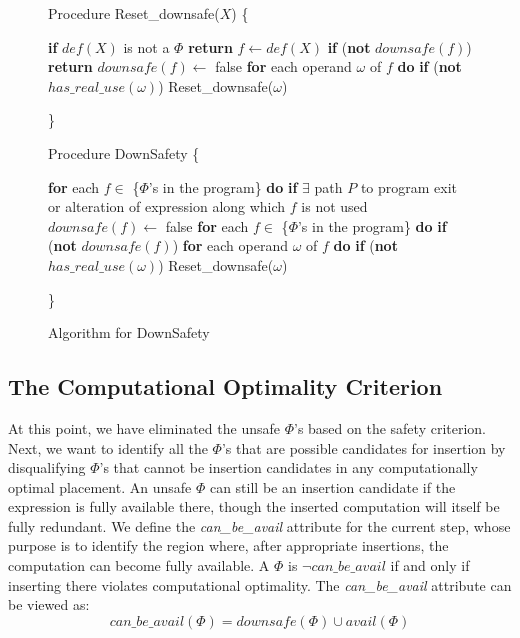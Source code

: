 \begin{figure}[!ht]
\setcounter{linectr}{0}
\centering
\begin{minipage}[t]{5in}
Procedure Reset\_downsafe($X$) 
\{
\begin{code}
 {\bf if} $def(X)$ is not a $\Phi$
   {\bf return}
 $f \leftarrow def(X)$
 {\bf if} ({\bf not} $downsafe(f)$)
   {\bf return}
 $downsafe(f) \leftarrow$ false
 {\bf for} each operand $\omega$ of $f$ {\bf do}
   {\bf if} ({\bf not} $has\_real\_use(\omega)$)
     Reset\_downsafe($\omega$)
\end{code}
\}

Procedure DownSafety
\{
\begin{code}
 {\bf for} each $f \in$ \{$\Phi$'s in the program\} {\bf do}
   {\bf if} $\exists$ path $P$ to program exit or alteration of expression along which $f$ is not used
      $downsafe(f) \leftarrow$ false
 {\bf for} each $f \in$ \{$\Phi$'s in the program\} {\bf do}
   {\bf if} ({\bf not} $downsafe(f)$)
     {\bf for} each operand $\omega$ of $f$ {\bf do}
       {\bf if} ({\bf not} $has\_real\_use(\omega)$)
	    Reset\_downsafe($\omega$)
\end{code}
\}
\end{minipage}
\caption{Algorithm for DownSafety}
\label{fig: downsafety}
\end{figure}

\subsection{The Computational Optimality Criterion}

At this point, we have eliminated the unsafe $\Phi$'s based on the safety 
criterion.  Next, we want
to identify all the $\Phi$'s that are possible candidates for insertion by
disqualifying $\Phi$'s that cannot be insertion candidates in any 
computationally optimal placement.  An unsafe $\Phi$ can still be an insertion
candidate if the expression is fully available there, though the inserted
computation will itself be fully redundant.  
We define the \emph{can\_be\_avail} attribute for the current step, whose 
purpose is to identify the region where, after appropriate insertions,
the computation can become fully available.  A $\Phi$ is 
$\neg can\_be\_avail$ if and only if inserting there violates computational
optimality.  The \emph{can\_be\_avail} attribute can be viewed as:
$$ can\_be\_avail(\Phi) = downsafe(\Phi) \cup avail(\Phi) $$

